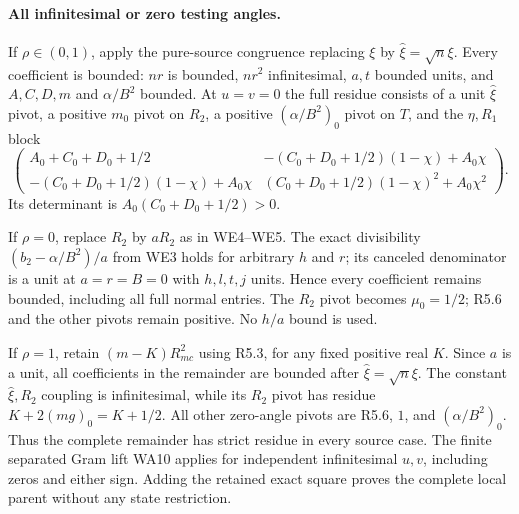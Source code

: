 \paragraph{All infinitesimal or zero testing angles.}
If $\rho\in(0,1)$, apply the pure-source congruence replacing $\xi$ by
$\widehat\xi=\sqrt n\xi$. Every coefficient is bounded: $nr$ is
bounded, $nr^2$ infinitesimal, $a,t$ bounded units, and $A,C,D,m$ and
$\alpha/B^2$ bounded. At $u=v=0$ the full residue consists of a unit
$\widehat\xi$ pivot, a positive $m_0$ pivot on $R_2$, a positive
$(\alpha/B^2)_0$ pivot on $T$, and the $\eta,R_1$ block
\[
 \begin{pmatrix}
 A_0+C_0+D_0+1/2&-(C_0+D_0+1/2)(1-\chi)+A_0\chi\\
 -(C_0+D_0+1/2)(1-\chi)+A_0\chi&
 (C_0+D_0+1/2)(1-\chi)^2+A_0\chi^2
 \end{pmatrix}.                                    \tag{R5.6}
\]
Its determinant is $A_0(C_0+D_0+1/2)>0$.

If $\rho=0$, replace $R_2$ by $aR_2$ as in WE4--WE5.
The exact divisibility $(b_2-\alpha/B^2)/a$ from WE3 holds for arbitrary
$h$ and $r$; its canceled denominator is a unit at $a=r=B=0$ with
$h,l,t,j$ units. Hence every coefficient remains bounded, including
all full normal entries. The $R_2$ pivot becomes $\mu_0=1/2$;
R5.6 and the other pivots remain positive. No $h/a$ bound is used.

If $\rho=1$, retain $(m-K)R_{mc}^2$ using R5.3, for any fixed
positive real $K$. Since $a$ is a unit, all coefficients in the
remainder are bounded after $\widehat\xi=\sqrt n\xi$.
The constant $\widehat\xi,R_2$ coupling is infinitesimal, while
its $R_2$ pivot has residue $K+2(mg)_0=K+1/2$.
All other zero-angle pivots are R5.6, $1$, and $(\alpha/B^2)_0$.
Thus the complete remainder has strict residue in every source case.
The finite separated Gram lift WA10 applies for independent infinitesimal
$u,v$, including zeros and either sign. Adding the retained exact square
proves the complete local parent without any state restriction.


